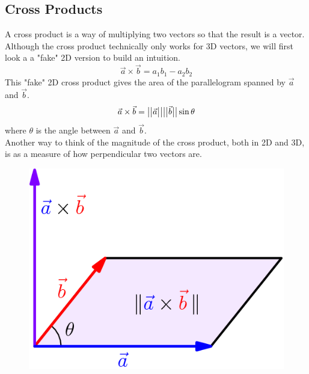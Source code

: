 \subsection{Cross Products}
\noindent
A cross product is a way of multiplying two vectors so that the result is a vector. Although the cross product technically only works for 3D vectors, we will first look a a "fake" 2D version to build an intuition.
\begin{equation*}
	\vec{a}\times\vec{b} = a_1b_1-a_2b_2
\end{equation*}
This "fake" 2D cross product gives the area of the parallelogram spanned by $\vec{a}$ and $\vec{b}$.
\begin{equation*}
	\vec{a}\times\vec{b} = \big\lvert \big\lvert \vec{a} \big\rvert \big\rvert\big\lvert \big\lvert \vec{b} \big\rvert \big\rvert\sin{\theta}	
\end{equation*}
where $\theta$ is the angle between $\vec{a}$ and $\vec{b}$.\\
Another way to think of the magnitude of the cross product, both in 2D and 3D, is as a measure of how perpendicular two vectors are.

\begin{figure}[H]
	\centering
	\includegraphics[scale=0.5]{Images/backgroundReview/CrossProduct}
\end{figure}

